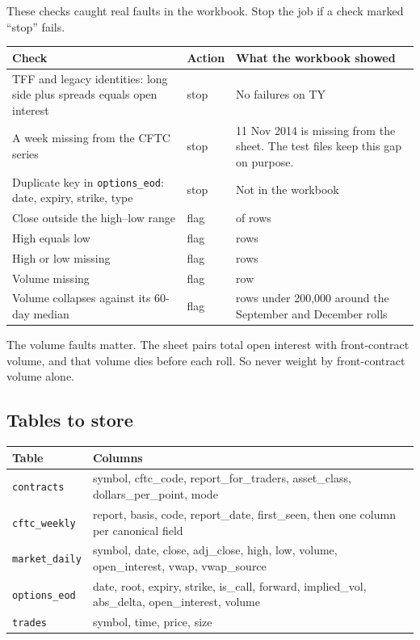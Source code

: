 \documentclass[11pt,a4paper]{article}
\newcommand{\code}[1]{\nolinkurl{#1}}
\begin{document}
These checks caught real faults in the workbook. Stop the job if a check marked ``stop'' fails.

\small
\begin{tabularx}{\linewidth}{@{}LlL@{}}
\toprule
Check & Action & What the workbook showed \\
\midrule
TFF and legacy identities: long side plus spreads equals open interest & stop & No failures on TY \\
A week missing from the CFTC series & stop & 11 Nov 2014 is missing from the sheet. The test files keep this gap on purpose. \\
Duplicate key in \code{options_eod}: date, expiry, strike, type & stop & Not in the workbook \\
Close outside the high--low range & flag & \QcOutside{} of \QcRows{} rows \\
High equals low & flag & \QcEqual{} rows \\
High or low missing & flag & \QcMissingRange{} rows \\
Volume missing & flag & \QcMissingVolume{} row \\
Volume collapses against its 60-day median & flag & \QcCollapse{} rows under 200,000 around the September and December rolls \\
\bottomrule
\end{tabularx}
\normalsize

The volume faults matter. The sheet pairs total open interest with front-contract volume, and that volume dies before each roll. So never weight by front-contract volume alone.

\subsection{Tables to store}

\small
\begin{tabularx}{\linewidth}{@{}lX@{}}
\toprule
Table & Columns \\
\midrule
\code{contracts} & symbol, cftc\_code, report\_for\_traders, asset\_class, dollars\_per\_point, mode \\
\code{cftc_weekly} & report, basis, code, report\_date, first\_seen, then one column per canonical field \\
\code{market_daily} & symbol, date, close, adj\_close, high, low, volume, open\_interest, vwap, vwap\_source \\
\code{options_eod} & date, root, expiry, strike, is\_call, forward, implied\_vol, abs\_delta, open\_interest, volume \\
\code{trades} & symbol, time, price, size \\
\bottomrule
\end{tabularx}
\normalsize
\end{document}
